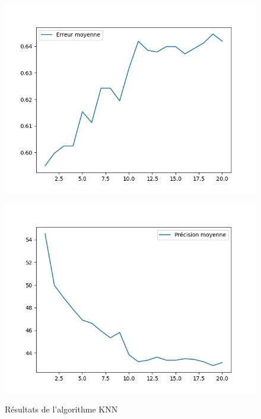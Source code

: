 \begin{figure}[!htb]

    \begin{minipage}{0.5\textwidth}
        \centering
        \includegraphics[width=01\textwidth]{../images/knn1.jpeg}
        \label{fig:knn}
    \end{minipage}\hfill

    \begin{minipage}{0.5\textwidth}
        \centering
        \includegraphics[width=01\textwidth]{../images/knn2.jpeg}
        \label{fig:knn2}
    \end{minipage}\hfill

    \caption{Résultats de l'algorithme KNN}

\end{figure}

